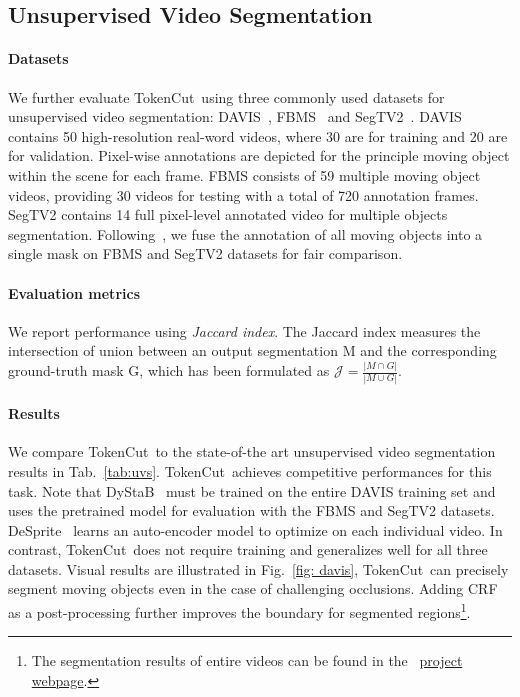 \documentclass[twocolumn]{article}
\newcommand{\name} {TokenCut}
\newcommand{\J}{\mathcal{J}}
\begin{document}
\subsection{Unsupervised Video Segmentation}
\label{sec:UVS}
\paragraph*{Datasets}
We further evaluate \name~using three commonly used datasets for unsupervised video segmentation: DAVIS~\cite{perazzi2016benchmark}, FBMS~\cite{ochs2013segmentation} and SegTV2~\cite{li2013video}.
DAVIS contains 50 high-resolution real-word videos, where 30 are for training and 20 are for validation. Pixel-wise annotations are depicted for the principle moving object within the scene for each frame. FBMS consists of 59 multiple moving object videos, providing 30 videos for testing with a total of 720 annotation frames. SegTV2 contains 14 full pixel-level annotated video for multiple objects segmentation. Following~\cite{yang2021self}, we fuse the annotation of all moving objects into a single mask on FBMS and SegTV2 datasets for fair comparison.

\paragraph*{Evaluation metrics} 
We report performance using \textit{Jaccard index}. The Jaccard index measures the intersection of union between an output segmentation M and the corresponding ground-truth mask G, which has been formulated as $\J = \frac{\left|M \cap G\right|}{\left|M \cup G\right|}$.

 
\paragraph*{Results}
We compare \name~to the state-of-the art unsupervised video segmentation results in Tab.~\ref{tab:uvs}. \name~achieves competitive performances for this task. Note that DyStaB~\cite{yang2021dystab} must be trained on the entire DAVIS training set and uses the pretrained model for evaluation with the FBMS and SegTV2 datasets. DeSprite~\cite{ye2022deformable} learns an auto-encoder model to optimize on each individual video. In contrast,  \name~does not require training  and generalizes well for all three datasets. Visual results are illustrated in Fig.~\ref{fig: davis}, \name~can precisely segment moving objects even in the case of challenging occlusions. Adding CRF as a post-processing further improves  the boundary for segmented regions\footnote{The segmentation results of entire videos can be found in the ~\href{https://www.m-psi.fr/Papers/TokenCut2022/}{project webpage}.}. 
\end{document}
